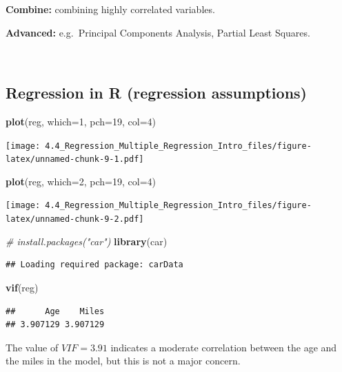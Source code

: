 \documentclass[
]{article}
\newenvironment{Shaded}{\begin{snugshade}}{\end{snugshade}}
\newcommand{\AttributeTok}[1]{\textcolor[rgb]{0.13,0.29,0.53}{#1}}
\newcommand{\CommentTok}[1]{\textcolor[rgb]{0.56,0.35,0.01}{\textit{#1}}}
\newcommand{\DecValTok}[1]{\textcolor[rgb]{0.00,0.00,0.81}{#1}}
\newcommand{\FunctionTok}[1]{\textcolor[rgb]{0.13,0.29,0.53}{\textbf{#1}}}
\newcommand{\NormalTok}[1]{#1}
\begin{document}
\textbf{Combine:} combining highly correlated variables.

\textbf{Advanced:} e.g.~Principal Components Analysis, Partial Least
Squares.

\(~\)

\hypertarget{regression-in-r-regression-assumptions}{%
\subsection{Regression in R (regression
assumptions)}\label{regression-in-r-regression-assumptions}}

\begin{Shaded}
\begin{Highlighting}[]
\FunctionTok{plot}\NormalTok{(reg, }\AttributeTok{which=}\DecValTok{1}\NormalTok{, }\AttributeTok{pch=}\DecValTok{19}\NormalTok{, }\AttributeTok{col=}\DecValTok{4}\NormalTok{)}
\end{Highlighting}
\end{Shaded}

\texttt{[image: 4.4\_Regression\_Multiple\_Regression\_Intro\_files/figure-latex/unnamed-chunk-9-1.pdf]}

\begin{Shaded}
\begin{Highlighting}[]
\FunctionTok{plot}\NormalTok{(reg, }\AttributeTok{which=}\DecValTok{2}\NormalTok{, }\AttributeTok{pch=}\DecValTok{19}\NormalTok{, }\AttributeTok{col=}\DecValTok{4}\NormalTok{)}
\end{Highlighting}
\end{Shaded}

\texttt{[image: 4.4\_Regression\_Multiple\_Regression\_Intro\_files/figure-latex/unnamed-chunk-9-2.pdf]}

\begin{Shaded}
\begin{Highlighting}[]
\CommentTok{\# install.packages("car")}
\FunctionTok{library}\NormalTok{(car)}
\end{Highlighting}
\end{Shaded}

\begin{verbatim}
## Loading required package: carData
\end{verbatim}

\begin{Shaded}
\begin{Highlighting}[]
\FunctionTok{vif}\NormalTok{(reg)}
\end{Highlighting}
\end{Shaded}

\begin{verbatim}
##      Age    Miles 
## 3.907129 3.907129
\end{verbatim}

The value of \(VIF=3.91\) indicates a moderate correlation between the
age and the miles in the model, but this is not a major concern.
\end{document}
